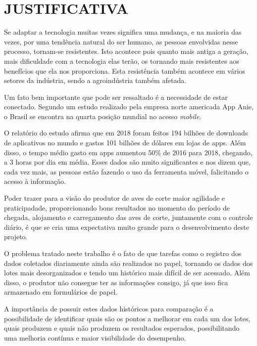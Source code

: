 
\chapter{JUSTIFICATIVA}
\label{chap:justificativa}

Se adaptar a tecnologia muitas vezes significa uma mudança, e na maioria das vezes, por uma tendência natural do ser humano, as pessoas envolvidas nesse processo, tornam-se resistentes. Isto acontece pois quanto mais antiga a geração, mais dificuldade com a tecnologia elas terão, os tornando mais resistentes aos benefícios que ela nos proporciona. Esta resistência também acontece em vários setores da indústria, sendo a agroindústria também afetada. 

Um fato bem importante que pode ser ressaltado é a necessidade de estar conectado. Segundo um estudo realizado pela empresa norte americada App Anie, o Brasil se encontra na quarta posição mundial no acesso \textit{mobile}. \cite{use_app}

O relatório do estudo afirma que em 2018 foram feitos 194 bilhões de downloads de aplicativos no mundo e gastos 101 bilhões de dólares em lojas de apps. Além disso, o tempo médio gasto em apps aumentou 50\% de 2016 para 2018, chegando, a 3 horas por dia em média. Esses dados são muito significantes e nos dizem que, cada vez mais, as pessoas estão fazendo o uso da ferramenta móvel, falicitando o acesso à informação.

Poder trazer para a visão do produtor de aves de corte maior agilidade e praticipadade, proporcionando bons resultados no momento do período de chegada, alojamento e carregamento das aves de corte, juntamente com o controle diário, é que se cria uma expectativa muito grande para o desenvolvimento deste projeto.

O problema tratado neste trabalho é o fato de que tarefas como o registro dos dados coletados diariamente ainda são realizados no papel, tornando os dados dos lotes mais desorganizados e tendo um histórico mais difícil de ser acessado. Além disso, o produtor não consegue ter as informações consigo, já que isso fica armazenado em formulários de papel.

A importância de possuir estes dados históricos para comparação é a possibilidade de identificar quais são os pontos a melhorar em cada um dos lotes, quais produzem e quais não produzem os resultados esperados, possibilitando uma melhoria contínua e maior visibilidade do desempenho. 
